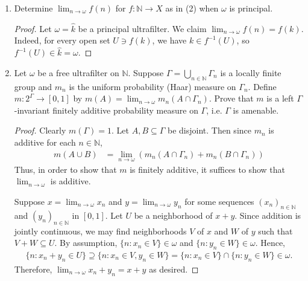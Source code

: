 \documentclass[a4paper,10pt]{report}
\newcommand{\N}{\mathbb{N}}
\begin{document}
\begin{enumerate}
\begin{enumerate}
\begin{proof}
					Hence $\omega \ni \{n\}$ for some $n \in \N$.
					This $n$ is necessarily unique, since $\omega$ is
					closed under finite intersections and does not contain the empty set.
					
					We claim that $\omega = \widehat{n} := \{A : n \in A\}$.
					First, $\widehat{n}$ is a filter.
					On the other hand, if $A \in \omega$, then $A \cap \{n\} \in \omega$,
					so $n \in A$.
					Hence, $\omega \subseteq \widehat{n}$.
					Since $\omega$ is an ultrafilter (and therefore a maximal filter),
					we must have $\omega = \widehat{n}$.
				\end{proof}
			\item Determine $\lim_{n \to \omega}{f(n)}$ for $f : \N \to X$ as in (2)
				when $\omega$ is principal.
				\begin{proof}
					Let $\omega = \widehat{k}$ be a principal ultrafilter.
					We claim $\lim_{n \to \omega}{f(n)} = f(k)$.
					Indeed, for every open set $U \ni f(k)$, we have
					$k \in f^{-1}(U)$, so $f^{-1}(U) \in \widehat{k} = \omega$.
				\end{proof}
			\item Let $\omega$ be a free ultrafilter on $\N$.
				Suppose $\Gamma = \bigcup_{n \in \N}{\Gamma_n}$ is a locally finite group
				and $m_n$ is the uniform probability (Haar) measure on $\Gamma_n$.
				Define $m : 2^{\Gamma} \to [0,1]$ by
				$m(A) = \lim_{n \to \omega}{m_n(A \cap \Gamma_n)}$.
				Prove that $m$ is a left $\Gamma$-invariant finitely additive probability measure
				on $\Gamma$, i.e. $\Gamma$ is amenable.
				\begin{proof}
					Clearly $m(\Gamma) = 1$.
					Let $A, B \subseteq \Gamma$ be disjoint.
					Then since $m_n$ is additive for each $n \in \N$,
					\begin{align*}
						m(A \cup B) & = \lim_{n \to \omega}
						{\left( m_n(A \cap \Gamma_n) + m_n(B \cap \Gamma_n) \right)}
					\end{align*}
					Thus, in order to show that $m$ is finitely additive,
					it suffices to show that $\lim_{n \to \omega}$ is additive.
					
					Suppose $x = \lim_{n \to \omega}{x_n}$ and $y = \lim_{n \to \omega}{y_n}$
					for some sequences $(x_n)_{n \in \N}$ and $(y_n)_{n \in \N}$ in $[0,1]$.
					Let $U$ be a neighborhood of $x + y$.
					Since addition is jointly continuous, we may find neighborhoods $V$ of $x$
					and $W$ of $y$ such that $V + W \subseteq U$.
					By assumption, $\{n : x_n \in V\} \in \omega$ and $\{n : y_n \in W\} \in \omega$.
					Hence,
					\begin{align*}
						\{n : x_n + y_n \in U\} \supseteq \{n : x_n \in V, y_n \in W\}
						 = \{n : x_n \in V\} \cap \{n : y_n \in W\} \in \omega.
					\end{align*}
					Therefore, $\lim_{n \to \omega}{x_n + y_n} = x + y$ as desired.
					

\end{proof}
\end{enumerate}
\end{enumerate}
\end{document}
